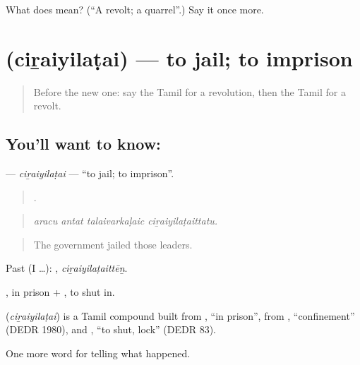 \begin{tcolorbox}[breakable,colback=teal!4,colframe=teal!35!black,title={Before you move on}]
What does  mean? (\textquotedblleft{}A revolt; a quarrel\textquotedblright{}.) Say it once more.
\end{tcolorbox}
\section[\texorpdfstring{\ta{சிறையிலடை} (ciṟaiyilaṭai)}{சிறையிலடை (ciṟaiyilaṭai)}]{ (ciṟaiyilaṭai) — to jail; to imprison}

\label{lesson:TA-C338-ciraiyilatai}



\begin{quote}
Before the new one: say the Tamil for a revolution, then the Tamil for a revolt.
\end{quote}

\subsection*{You'll want to know: }
\textbf{} — \emph{ciṟaiyilaṭai} — \textquotedblleft{}to jail; to imprison\textquotedblright{}.

\begin{quote}
   .
\end{quote}

\begin{quote}
\emph{aracu antat talaivarkaḷaic ciṟaiyilaṭaittatu.}
\end{quote}

\begin{quote}
The government jailed those leaders.
\end{quote}

Past (I …): , \emph{ciṟaiyilaṭaittēṉ}.

, in prison + , to shut in.

\begin{cousinweb}
\textbf{} (\emph{ciṟaiyilaṭai}) is a Tamil compound built from , \textquotedblleft{}in prison\textquotedblright{}, from , \textquotedblleft{}confinement\textquotedblright{} (DEDR 1980), and , \textquotedblleft{}to shut, lock\textquotedblright{} (DEDR 83).
\end{cousinweb}

\begin{grammarlens}[title={What you've built}]
One more word for telling what happened.
\end{grammarlens}

